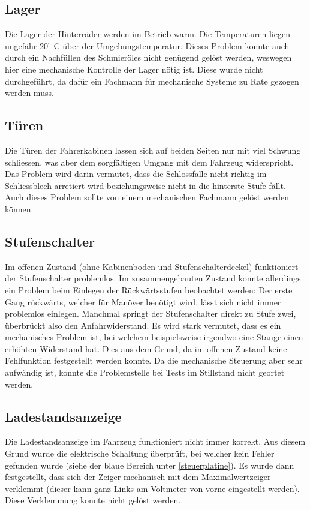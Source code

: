 \subsection{Lager}
Die Lager der Hinterräder werden im Betrieb warm. Die Temperaturen liegen ungefähr $20^\circ$ C über der Umgebungstemperatur. Dieses Problem konnte auch durch ein Nachfüllen des Schmieröles nicht genügend gelöst werden, weswegen hier eine mechanische Kontrolle der Lager nötig ist. Diese wurde nicht durchgeführt, da dafür ein Fachmann für mechanische Systeme zu Rate gezogen werden muss.

\subsection{Türen}
Die Türen der Fahrerkabinen lassen sich auf beiden Seiten nur mit viel Schwung schliessen, was aber dem sorgfältigen Umgang mit dem Fahrzeug widerspricht. Das Problem wird darin vermutet, dass die Schlossfalle nicht richtig im Schliessblech arretiert wird beziehungsweise nicht in die hinterste Stufe fällt. Auch dieses Problem sollte von einem mechanischen Fachmann gelöst werden können.

\subsection{Stufenschalter}
Im offenen Zustand (ohne Kabinenboden und Stufenschalterdeckel) funktioniert der Stufenschalter problemlos. Im zusammengebauten Zustand konnte allerdings ein Problem beim Einlegen der Rückwärtsstufen beobachtet werden: Der erste Gang rückwärts, welcher für Manöver benötigt wird, lässt sich nicht immer problemlos einlegen. Manchmal springt der Stufenschalter direkt zu Stufe zwei, überbrückt also den Anfahrwiderstand. Es wird stark vermutet, dass es ein mechanisches Problem ist, bei welchem beispielsweise irgendwo eine Stange einen erhöhten Widerstand hat. Dies aus dem Grund, da im offenen Zustand keine Fehlfunktion festgestellt werden konnte. Da die mechanische Steuerung aber sehr aufwändig ist, konnte die Problemstelle bei Tests im Stillstand nicht geortet werden.

\subsection{Ladestandsanzeige}
Die Ladestandsanzeige im Fahrzeug funktioniert nicht immer korrekt. Aus diesem Grund wurde die elektrische Schaltung überprüft, bei welcher kein Fehler gefunden wurde (siehe der blaue Bereich unter \ref{steuerplatine}). Es wurde dann festgestellt, dass sich der Zeiger mechanisch mit dem Maximalwertzeiger verklemmt (dieser kann ganz Links am Voltmeter von vorne eingestellt werden). Diese Verklemmung konnte nicht gelöst werden.

\color{black}